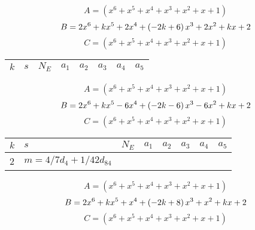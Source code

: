 \documentclass{amsart}
\begin{document}
$$A=(x^6
 + x^5
 + x^4
 + x^3
 + x^2
 + x
 + 1)$$
$$B=2\*x^6
 + k\*x^5
 + 2\*x^4
 + \left(-2\*k
 + 6\right) \*x^3
 + 2\*x^2
 + k\*x
 + 2$$
$$C=(x^6
 + x^5
 + x^4
 + x^3
 + x^2
 + x
 + 1)$$
\begin{longtable}{|l|l|l|lllll|}
\hline
$k$ & $s$ & $N_E$ & $a_1$ & $a_2$ & $a_3$ & $a_4$ & $a_5$\\
\hline
\hline
\end{longtable}
$$A=(x^6
 + x^5
 + x^4
 + x^3
 + x^2
 + x
 + 1)$$
$$B=2\*x^6
 + k\*x^5
 - 6\*x^4
 + \left(-2\*k
 - 6\right) \*x^3
 - 6\*x^2
 + k\*x
 + 2$$
$$C=(x^6
 + x^5
 + x^4
 + x^3
 + x^2
 + x
 + 1)$$
\begin{longtable}{|l|l|l|lllll|}
\hline
$k$ & $s$ & $N_E$ & $a_1$ & $a_2$ & $a_3$ & $a_4$ & $a_5$\\
\hline
2&$m=4/7d_{4}+1/42d_{84}$&&\multicolumn{5}{c|}{}\\
\hline
\end{longtable}
$$A=(x^6
 + x^5
 + x^4
 + x^3
 + x^2
 + x
 + 1)$$
$$B=2\*x^6
 + k\*x^5
 + x^4
 + \left(-2\*k
 + 8\right) \*x^3
 + x^2
 + k\*x
 + 2$$
$$C=(x^6
 + x^5
 + x^4
 + x^3
 + x^2
 + x
 + 1)$$
\end{document}
